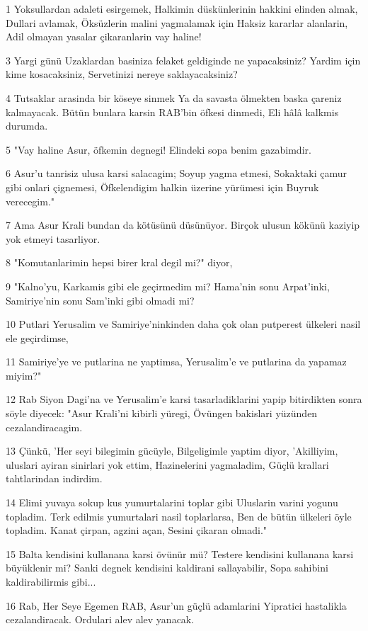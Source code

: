 \par 1 Yoksullardan adaleti esirgemek, Halkimin düskünlerinin hakkini elinden almak, Dullari avlamak, Öksüzlerin malini yagmalamak için Haksiz kararlar alanlarin, Adil olmayan yasalar çikaranlarin vay haline!
\par 3 Yargi günü Uzaklardan basiniza felaket geldiginde ne yapacaksiniz? Yardim için kime kosacaksiniz, Servetinizi nereye saklayacaksiniz?
\par 4 Tutsaklar arasinda bir köseye sinmek Ya da savasta ölmekten baska çareniz kalmayacak. Bütün bunlara karsin RAB'bin öfkesi dinmedi, Eli hâlâ kalkmis durumda.
\par 5 "Vay haline Asur, öfkemin degnegi! Elindeki sopa benim gazabimdir.
\par 6 Asur'u tanrisiz ulusa karsi salacagim; Soyup yagma etmesi, Sokaktaki çamur gibi onlari çignemesi, Öfkelendigim halkin üzerine yürümesi için Buyruk verecegim."
\par 7 Ama Asur Krali bundan da kötüsünü düsünüyor. Birçok ulusun kökünü kaziyip yok etmeyi tasarliyor.
\par 8 "Komutanlarimin hepsi birer kral degil mi?" diyor,
\par 9 "Kalno'yu, Karkamis gibi ele geçirmedim mi? Hama'nin sonu Arpat'inki, Samiriye'nin sonu Sam'inki gibi olmadi mi?
\par 10 Putlari Yerusalim ve Samiriye'ninkinden daha çok olan putperest ülkeleri nasil ele geçirdimse,
\par 11 Samiriye'ye ve putlarina ne yaptimsa, Yerusalim'e ve putlarina da yapamaz miyim?"
\par 12 Rab Siyon Dagi'na ve Yerusalim'e karsi tasarladiklarini yapip bitirdikten sonra söyle diyecek: "Asur Krali'ni kibirli yüregi, Övüngen bakislari yüzünden cezalandiracagim.
\par 13 Çünkü, 'Her seyi bilegimin gücüyle, Bilgeligimle yaptim diyor, 'Akilliyim, uluslari ayiran sinirlari yok ettim, Hazinelerini yagmaladim, Güçlü krallari tahtlarindan indirdim.
\par 14 Elimi yuvaya sokup kus yumurtalarini toplar gibi Uluslarin varini yogunu topladim. Terk edilmis yumurtalari nasil toplarlarsa, Ben de bütün ülkeleri öyle topladim. Kanat çirpan, agzini açan, Sesini çikaran olmadi."
\par 15 Balta kendisini kullanana karsi övünür mü? Testere kendisini kullanana karsi büyüklenir mi? Sanki degnek kendisini kaldirani sallayabilir, Sopa sahibini kaldirabilirmis gibi...
\par 16 Rab, Her Seye Egemen RAB, Asur'un güçlü adamlarini Yipratici hastalikla cezalandiracak. Ordulari alev alev yanacak.
